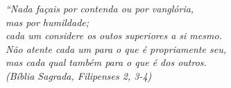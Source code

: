 \begin{epigrafe}
    \vspace*{\fill}
	\begin{flushright}
		\textit{``Nada façais por contenda ou por vanglória, \\
		mas por humildade; \\
		cada um considere os outos superiores a si mesmo. \\
		Não atente cada um para o que é propriamente seu, \\
		mas cada qual também para o que é dos outros.\\
		(Bíblia Sagrada, Filipenses 2, 3-4)}
	\end{flushright}
\end{epigrafe}
